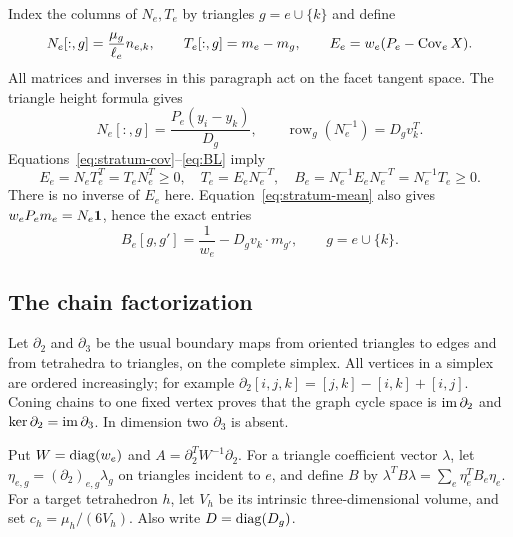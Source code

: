 Index the columns of $N_e,T_e$ by triangles $g=e\cup\{k\}$ and define
\[
 N_e[:,g]=\frac{\mu_g}{\ell_e}n_{e,k},\qquad
 T_e[:,g]=m_e-m_g,\qquad E_e=w_e(P_e-\operatorname{Cov}_e X).
\]
All matrices and inverses in this paragraph act on the facet tangent space.
The triangle height formula gives
\begin{equation}\label{eq:Ninverse}
 N_e[:,g]=\frac{P_e(y_i-y_k)}{D_g},
 \qquad \operatorname{row}_g(N_e^{-1})=D_gv_k^T.
\end{equation}
Equations~\eqref{eq:stratum-cov}--\eqref{eq:BL} imply
\begin{equation}\label{eq:Blocal}
 E_e=N_eT_e^T=T_eN_e^T\geq0,\quad
 T_e=E_eN_e^{-T},\quad
 B_e=N_e^{-1}E_eN_e^{-T}=N_e^{-1}T_e\geq0.
\end{equation}
There is no inverse of $E_e$ here. Equation~\eqref{eq:stratum-mean} also gives
$w_eP_em_e=N_e\mathbf 1$, hence the exact entries
\begin{equation}\label{eq:Bentries}
 B_e[g,g']=\frac1{w_e}-D_gv_k\cdot m_{g'},\qquad g=e\cup\{k\}.
\end{equation}

\subsection{The chain factorization}
Let $\partial_2$ and $\partial_3$ be the usual boundary maps from oriented
triangles to edges and from tetrahedra to triangles, on the complete simplex.
All vertices in a simplex are ordered increasingly; for example
$\partial_2[i,j,k]=[j,k]-[i,k]+[i,j]$.
Coning chains to one fixed vertex proves that the graph cycle space is
$\operatorname{im}\partial_2$ and $\ker\partial_2=\operatorname{im}\partial_3$.
In dimension two $\partial_3$ is absent.

Put $W=\operatorname{diag}(w_e)$ and
$A=\partial_2^TW^{-1}\partial_2$. For a triangle coefficient vector
$\lambda$, let $\eta_{e,g}=(\partial_2)_{e,g}\lambda_g$ on triangles
incident to $e$, and define $B$ by
$\lambda^TB\lambda=\sum_e\eta_e^TB_e\eta_e$.
For a target tetrahedron $h$, let $V_h$ be its intrinsic three-dimensional
volume, and set $c_h=\mu_h/(6V_h)$. Also write $D=\operatorname{diag}(D_g)$.

